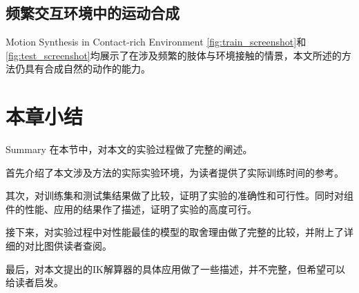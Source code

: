 \subsection{频繁交互环境中的运动合成}{Motion Synthesis in Contact-rich Environment}
\cref{fig:train_screenshot}和\cref{fig:test_screenshot}均展示了在涉及频繁的肢体与环境接触的情景，本文所述的方法仍具有合成自然的动作的能力。
\section{本章小结}{Summary}
在本节中，对本文的实验过程做了完整的阐述。

首先介绍了本文涉及方法的实际实验环境，为读者提供了实际训练时间的参考。

其次，对训练集和测试集结果做了比较，证明了实验的准确性和可行性。同时对组件的性能、应用的结果作了描述，证明了实验的高度可行。

接下来，对实验过程中对性能最佳的模型的取舍理由做了完整的比较，并附上了详细的对比图供读者查阅。

最后，对本文提出的IK解算器的具体应用做了一些描述，并不完整，但希望可以给读者启发。
